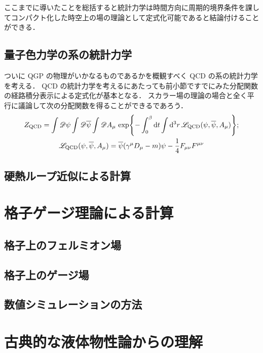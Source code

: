 \documentclass[dvipdfmx, a4paper]{jarticle}
\numberwithin{equation}{section}
\begin{document}
ここまでに導いたことを総括すると統計力学は時間方向に周期的境界条件を課してコンパクト化した時空上の場の理論として定式化可能であると結論付けることができる．

\subsection{量子色力学の系の統計力学}
ついに QGP の物理がいかなるものであるかを概観すべく QCD の系の統計力学を考える．
QCD の統計力学を考えるにあたっても前小節ですでにみた分配関数の経路積分表示による定式化が基本となる．
スカラー場の理論の場合と全く平行に議論して次の分配関数を得ることができるであろう．
\begin{gather}
  Z_\mathrm{QCD} = \int \mathscr{D} \psi \int \mathscr{D} \overline{\psi} \int \mathscr{D} A_\mu \, \exp{-\int_0^\beta \dd t \int \dd^3 r \, \mathscr{L}_\mathrm{QCD}(\psi, \overline{\psi}, A_\mu)}; \notag\\
  \mathscr{L}_\mathrm{QCD}(\psi, \overline{\psi}, A_\mu) = \overline{\psi} \qty(\gamma^\mu D_\mu - m) \psi -\frac{1}{4}F_{\mu\nu} F^{\mu\nu}
\end{gather}


\subsection{硬熱ループ近似による計算}

\newpage
\section{格子ゲージ理論による計算}

\subsection{格子上のフェルミオン場}

\subsection{格子上のゲージ場}

\subsection{数値シミュレーションの方法}

\newpage

\section{古典的な液体物性論からの理解}
\end{document}

